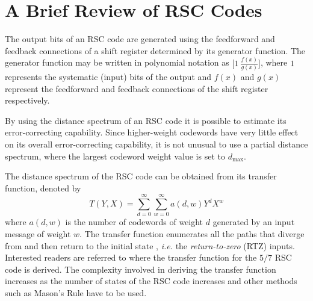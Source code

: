 \section{A Brief Review of RSC Codes}
\label{sec2}
The output bits of an RSC code are generated using the feedforward and feedback connections of a shift register determined by its generator function. The generator function may be written in polynomial notation as $\Big[1 ~\frac{f(x)}{g(x)}\Big]$, where $1$ represents the systematic (input) bits  of the output and $f(x)$ and $g(x)$ represent the feedforward and feedback connections of the shift register respectively. 

By using the distance spectrum of an RSC code it is possible to estimate its error-correcting capability. Since higher-weight codewords have very little effect on its overall error-correcting capability, it is not unusual to use a partial distance spectrum, where the largest codeword weight value is set to $d_{\text{max}}$. 

The distance spectrum of the RSC code can be obtained from its transfer function, denoted by $$T(Y,X)=\sum_{d=0}^{\infty}\sum_{w=0}^{\infty} a(d,w)Y^dX^w$$ where $a(d,w)$ is the number of codewords of weight $d$ generated by an input message of weight $w$. The transfer function enumerates all the paths that diverge from and then return to the initial state \cite{ref3}, \textit{i.e.} the \textit{return-to-zero} (RTZ) inputs.
Interested readers are referred to \cite{ref3} where the transfer function for the $5/7$ RSC code is derived.
The complexity involved in deriving the transfer function increases as the number of states of the RSC code increases and other methods such as Mason's Rule \cite{ref3} have to be used. 

